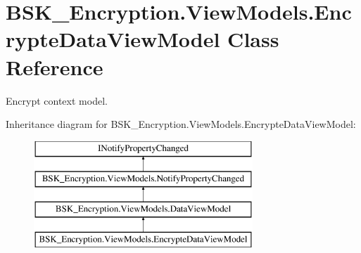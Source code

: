 \hypertarget{class_b_s_k___encryption_1_1_view_models_1_1_encrypte_data_view_model}{}\section{B\+S\+K\+\_\+\+Encryption.\+View\+Models.\+Encrypte\+Data\+View\+Model Class Reference}
\label{class_b_s_k___encryption_1_1_view_models_1_1_encrypte_data_view_model}


Encrypt context model.  


Inheritance diagram for B\+S\+K\+\_\+\+Encryption.\+View\+Models.\+Encrypte\+Data\+View\+Model\+:\begin{figure}[H]
\begin{center}
\leavevmode
\includegraphics[height=4.000000cm]{class_b_s_k___encryption_1_1_view_models_1_1_encrypte_data_view_model}
\end{center}
\end{figure}
